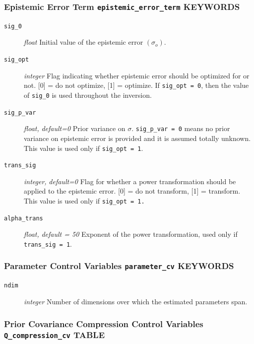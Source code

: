 \documentclass[11pt,oneside,onecolumn]{usgsreport}
\begin{document}
\begin{appendix}
\subsubsection{Epistemic Error Term \texttt{epistemic\_error\_term} KEYWORDS}
\begin{description}
\item [{\texttt{sig\_0}}] \emph{float }Initial value of the epistemic error
$\left(\sigma_{o}\right)$.
\item [{\texttt{sig\_opt}}] \emph{integer }Flag indicating whether epistemic
error should be optimized for or not. {[}0{]} = do not optimize, {[}1{]}
= optimize. If \texttt{sig\_opt = 0}, then the value of \texttt{sig\_0}
is used throughout the inversion.
\item [{\texttt{sig\_p\_var}}] \emph{float, }\textit{default=0}\emph{ }Prior
variance on $\sigma$. \texttt{sig\_p\_var = 0} means no prior variance
on epistemic error is provided and it is assumed totally unknown.
This value is used only if \texttt{sig\_opt = 1}. 
\item [{\texttt{trans\_sig}}] \emph{integer, }\textit{default=0}\emph{
}Flag for whether a power transformation should be applied to the
epistemic error. {[}0{]} = do not transform, {[}1{]} = transform.
This value is used only if \texttt{sig\_opt = 1.} 
\item [{\texttt{alpha\_trans}}] \emph{float, }\textit{default = 50} Exponent
of the power transformation, used only if \texttt{trans\_sig = 1}.

\end{description}

\subsubsection{Parameter Control Variables \texttt{parameter\_cv} KEYWORDS}
\begin{description}
\item [{\texttt{ndim}}] \emph{integer} Number of dimensions over which
the estimated parameters span.
\end{description}

\subsubsection{Prior Covariance Compression Control Variables \texttt{Q\_compression\_cv}
TABLE}


\end{appendix}
\end{document}
